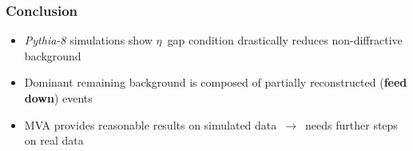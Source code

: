 \documentclass{beamer}
\begin{document}

{
\begin{frame}
    \frametitle{Conclusion}
    \begin{itemize}
        \item \emph{Pythia-8} simulations show $\eta$~gap condition drastically reduces non-diffractive background 
        \item Dominant remaining background is composed of partially reconstructed (\textbf{feed down}) events
        \item MVA provides reasonable results on simulated data~$\to$~needs further steps on real data
    \end{itemize}
\end{frame}
}

\end{document}
